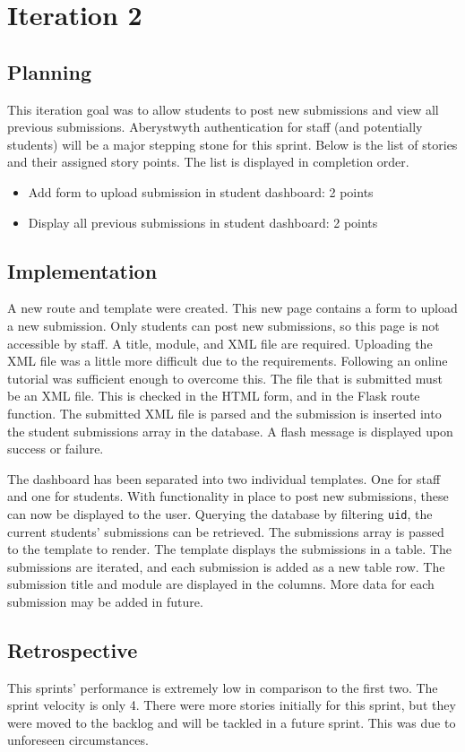 \chapter{Iteration 2}
\section{Planning}
This iteration goal was to allow students to post new submissions and view all previous submissions. Aberystwyth authentication for staff (and potentially students) will be a major stepping stone for this sprint. Below is the list of stories and their assigned story points. The list is displayed in completion order.

\begin{itemize}
\item Add form to upload submission in student dashboard: 2 points
\item Display all previous submissions in student dashboard: 2 points
\end{itemize}

\section{Implementation}
A new route and template were created. This new page contains a form to upload a new submission. Only students can post new submissions, so this page is not accessible by staff. A title, module, and XML file are required. Uploading the XML file was a little more difficult due to the requirements. Following an online tutorial was sufficient enough to overcome this\cite{FlaskUploadingFiles}. The file that is submitted must be an XML file. This is checked in the HTML form, and in the Flask route function. The submitted XML file is parsed and the submission is inserted into the student submissions array in the database. A flash message is displayed upon success or failure.

The dashboard has been separated into two individual templates. One for staff and one for students. With functionality in place to post new submissions, these can now be displayed to the user. Querying the database by filtering \texttt{uid}, the current students' submissions can be retrieved. The submissions array is passed to the template to render. The template displays the submissions in a table. The submissions are iterated, and each submission is added as a new table row. The submission title and module are displayed in the columns. More data for each submission may be added in future.

\section{Retrospective}
This sprints' performance is extremely low in comparison to the first two. The sprint velocity is only 4. There were more stories initially for this sprint, but they were moved to the backlog and will be tackled in a future sprint. This was due to unforeseen circumstances. 
